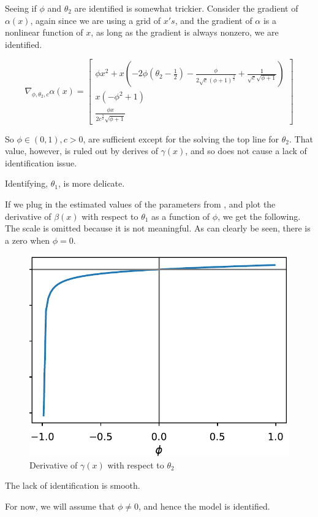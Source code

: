 \documentclass[11pt]{article}
\begin{document}
Seeing if $\phi$ and $\theta_2$ are identified is somewhat trickier. 
Consider the gradient of $\alpha(x)$, again since we are using a grid of $x's$, and the gradient of $\alpha$ is a
nonlinear function of $x$, as long as the gradient is always nonzero, we are identified.

\begin{equation}
    \nabla_{\phi, \theta_2, c}  \alpha(x) = \begin{bmatrix} \phi x^{2} + x \left(- 2 \phi \left(\theta_{2} -
    \frac{1}{2}\right) - \frac{\phi}{2 \sqrt{c} \left(\phi + 1\right)^{\frac{3}{2}}} + \frac{1}{\sqrt{c}
    \sqrt{\phi + 1}}\right) \\ x \left(- \phi^{2} + 1\right) \\ \frac{\phi x}{2 c^{\frac{3}{2}} \sqrt{\phi + 1}}
\end{bmatrix} 
\end{equation}

So $\phi \in (0,1), c > 0$, are sufficient except for the solving the top line for $\theta_2$.
That value, however, is ruled out by derives of $\gamma(x)$, and so does not cause a lack of identification issue.

Identifying, $\theta_1$, is more delicate.

If we plug in the estimated values of the parameters from \textcite{khrapov2016affine}, and plot the derivative
of $\beta(x)$ with respect to $\theta_1$ as a function of $\phi$, we get the following.
The scale is omitted because it is not meaningful. 
As can clearly be seen, there is a zero when $\phi = 0$.

\begin{figure}[htb]
    \centering
    \caption{Derivative of $\gamma(x)$ with respect to $\theta_2$}
    \includegraphics[width=.5\textwidth]{gamma_diff_theta2.pdf}
\end{figure}

The lack of identification is smooth.

For now, we will assume that $\phi \neq 0$, and hence the model is identified.
\end{document}
